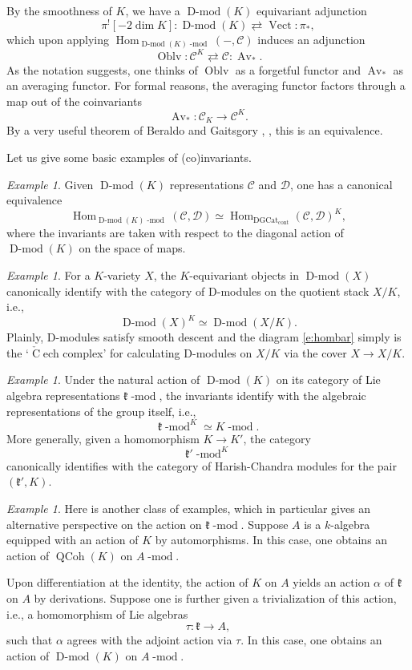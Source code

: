 \documentclass[10pt]{amsart}
\newcommand{\udHom}{\on{Hom}_{\DGCat}}
\newcommand{\on}{\operatorname}
\renewcommand{\mod}{\on{-mod}}
\newcommand{\Dmod}{\on{D-mod}}
\newcommand{\Vect}{\on{Vect}}
\theoremstyle{remark}
\newtheorem{ex}[subsubsection]{Example}
\newcommand{\fk}{\mathfrak{k}}
\newcommand{\Hom}{\operatorname{Hom}}
\newcommand{\sD}{\mathscr{D}}
\numberwithin{equation}{section}
\newcommand{\sC}{\mathscr{C}}
\newcommand{\msf}{\operatorname}
\renewcommand{\mod}{\operatorname{-mod}}
\newcommand{\QCoh}{\on{QCoh}}
\newcommand{\DGCat}{\msf{DGCat}_{\on{cont}}}
\begin{document}
By the smoothness of $K$, we have a $\Dmod(K)$ equivariant adjunction 
%
\[
     \pi^![-2 \dim K]: \Dmod(K) \rightleftarrows \Vect: \pi_*,
\]
which upon applying $\Hom_{\Dmod(K)\mod}( -, \sC)$ induces an adjunction 
%
\[
    \on{Oblv}: \sC^K \rightleftarrows \sC: \on{Av}_*.
\]
%
As the notation suggests, one thinks of $\on{Oblv}$ as a forgetful functor and 
$\on{Av}_*$ as an averaging functor. For formal reasons, the averaging functor 
factors through a map out of the coinvariants
%
\[
 \on{Av}_*: \sC_K \rightarrow \sC^K.
\]
%
By a very useful theorem of Beraldo and Gaitsgory \cite{Bearaldo}, \cite{whitlocglob}, this is an equivalence. 


Let us give some basic examples of (co)invariants. 

\begin{ex}Given $\Dmod(K)$ representations $\sC$ and $\sD$, one has a canonical 
equivalence 
	\[
       \Hom_{\Dmod(K)\mod}(\sC, \sD) \simeq \udHom(\sC, \sD)^K,
	\]
	where the invariants are taken with respect to the diagonal action of 
	$\Dmod(K)$ on the space of maps. 
\end{ex}


\begin{ex} \label{e:dmodquotstack} For a $K$-variety $X$, the $K$-equivariant 
objects in $\Dmod(X)$ 
canonically identify with the category of D-modules on the quotient stack 
$X/K$, i.e., 
	\[
	     \Dmod(X)^K \simeq \Dmod(X/K).
	\]
Plainly, D-modules satisfy smooth descent and the diagram \eqref{e:hombar} 
simply is the `$\check{\on{C}}$ech complex' for calculating D-modules on $X/K$ via the cover 
$X 
\rightarrow X/K$.  
\end{ex}


\begin{ex} Under the natural action of $\Dmod(K)$ on its category of Lie 
algebra representations $\fk\mod$, the invariants identify with the 
algebraic representations of the group itself, i.e., 
%
\[
      \fk\mod^K \simeq K\mod. 
\]
%	
More generally, given a homomorphism $K \rightarrow K'$, the category 
%
\[
 \fk'\mod^K
\]
%
canonically identifies with the category of Harish-Chandra modules for the pair $(\fk', K)$. 
\end{ex}


\begin{ex} Here is another class of examples, which in particular gives an alternative perspective on the action on $\fk\mod$. Suppose $A$ is a $k$-algebra equipped with an action of $K$ by automorphisms. In this case, one obtains an action of $\QCoh(K)$ on $A\mod$.

Upon differentiation at the identity, the action of $K$ on $A$ yields  an action $\alpha$ of $\fk$ on $A$ by derivations. Suppose one is further given a trivialization of this action, i.e., a homomorphism of Lie algebras $$\tau: \fk \rightarrow A,$$such that $\alpha$ agrees with the adjoint action via $\tau$. In this case, one obtains an action of $\Dmod(K)$ on $A\mod$. \end{ex}
\end{document}
